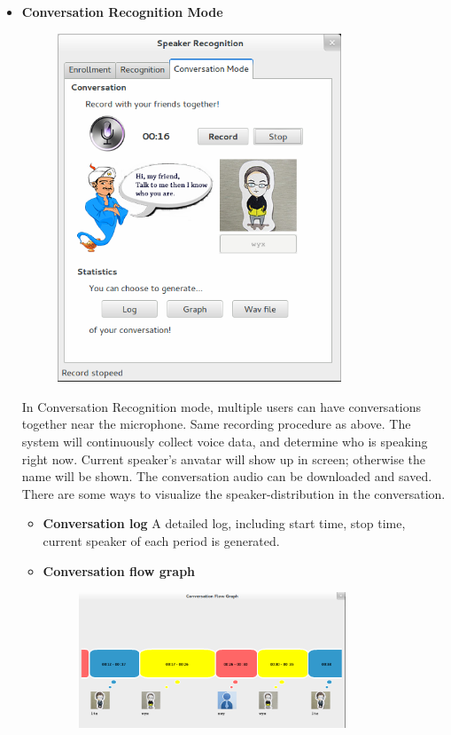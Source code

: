 \begin{itemize}
  \item \textbf{Conversation Recognition Mode} \\
    \begin{figure}[H]
      \centering
      \includegraphics[width=0.8\textwidth]{img/conversation.png}
      \caption{\label{fig:}}
    \end{figure}

    In Conversation Recognition mode, multiple users can have conversations
    together near the microphone. Same recording procedure as above.
    The system will continuously collect voice data, and determine
    who is speaking right now. Current speaker's anvatar will show up
    in screen; otherwise the name will be shown. The conversation
    audio can be downloaded and saved.
    There are some ways to visualize the speaker-distribution in the
    conversation.
    \begin{itemize}
      \item \textbf{Conversation log}
        A detailed log, including start time, stop time,
        current speaker of each period is generated.
      \item \textbf{Conversation flow graph}
        \begin{figure}[H]
          \centering
          \includegraphics[width=0.8\textwidth]{img/conversationgraph.png}
        \end{figure}


\end{itemize}
\end{itemize}
